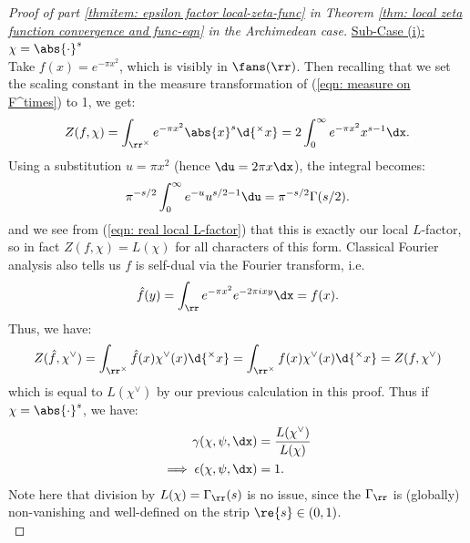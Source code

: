 \documentclass[11pt, x11names, openany]{book}
\begin{document}
\begin{proof}[Proof of part \ref{thmitem: epsilon factor local-zeta-func} in Theorem \ref{thm: local zeta function convergence and func-eqn} in the Archimedean case]
\underline{Sub-Case (i): $\chi = \abs{\cdot}^s$}\\
Take $f(x) = e^{- \pi x^2}$, which is visibly in $\fans(\rr)$. Then recalling that we set the scaling constant in the measure transformation of (\ref{eqn: measure on F^times}) to 1, we get:
\begin{equation*}
    Z(f, \chi) = \int_{\rr^\times} e^{-\pi x^2} \abs{x}^s \d{^\times x} = 2 \int^\infty_0 e^{-\pi x^2} x^{s-1} \dx.
\end{equation*}
Using a substitution $u = \pi x^2$ (hence $\du = 2 \pi x \dx$),  the integral becomes:
\begin{equation*}
    \pi^{-s/2} \int^\infty_0 e^{-u} u^{s/2 - 1} \du = \pi^{-s/2} \Gamma(s/2).
\end{equation*}
and we see from (\ref{eqn: real local L-factor}) that this is exactly our local $L$-factor, so in fact $Z(f, \chi) = L(\chi)$ for all characters of this form. Classical Fourier analysis also tells us $f$ is self-dual via the Fourier transform, i.e.
\begin{equation*}
    \hat{f}(y) = \int_\rr e^{-\pi x^2} e^{-2 \pi i xy} \dx = f(x).
\end{equation*}
Thus, we have:
\begin{equation*}
    Z(\hat{f}, \chi^\lor) = \int_{\rr^\times} \hat{f}(x) \chi^\lor(x) \d{^\times x} = \int_{\rr^\times} f(x) \chi^\lor(x) \d{^\times x} = Z(f, \chi^\lor)
\end{equation*}
which is equal to $L(\chi^\lor)$ by our previous calculation in this proof. Thus if $\chi = \abs{\cdot}^s$, we have:
\begin{align}
\label{eqn: real epsilon factor 1}
    \gamma(\chi, \psi, \dx) &= \frac{L(\chi^\lor)}{L(\chi)} \nonumber \\
    \implies \epsilon(\chi, \psi, \dx) &= 1.
\end{align}
Note here that division by $L(\chi) = \Gamma_\rr(s)$ is no issue, since the $\Gamma_\rr$ is (globally) non-vanishing and well-defined on the strip $\re{s} \in (0, 1)$.\\


\end{proof}
\end{document}
